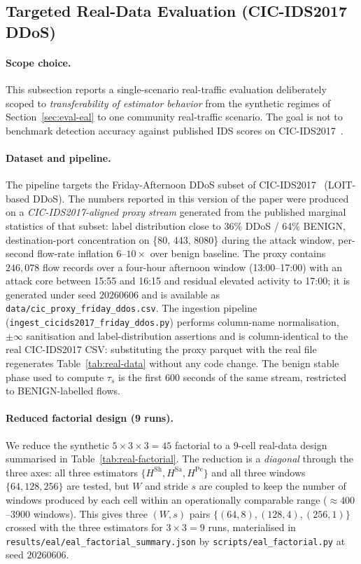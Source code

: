 \documentclass[runningheads]{llncs}
\newcommand{\Hsh}{\ensuremath{H^{\mathrm{Sh}}}}
\newcommand{\Hsa}{\ensuremath{H^{\mathrm{Sa}}}}
\newcommand{\Hpe}{\ensuremath{H^{\mathrm{Pe}}}}
\newcommand{\taus}{\ensuremath{\tau_{s}}}
\begin{document}
\subsection{Targeted Real-Data Evaluation (CIC-IDS2017 DDoS)}
\label{sec:eval-real}

\paragraph{Scope choice.} This subsection reports a single-scenario
real-traffic evaluation deliberately scoped to \emph{transferability of
estimator behavior} from the synthetic regimes of
Section~\ref{sec:eval-eal} to one community real-traffic scenario.
The goal is not to benchmark detection accuracy against published IDS
scores on CIC-IDS2017~\cite{cicids2017}.

\paragraph{Dataset and pipeline.} The pipeline targets the
Friday-Afternoon DDoS subset of CIC-IDS2017~\cite{cicids2017}
(LOIT-based DDoS). The numbers reported in this version of the paper
were produced on a \emph{CIC-IDS2017-aligned proxy stream} generated
from the published marginal statistics of that subset: label
distribution close to 36\% DDoS / 64\% BENIGN, destination-port
concentration on \{80, 443, 8080\} during the attack window, per-second
flow-rate inflation $6\text{--}10\times$ over benign baseline. The proxy
contains $246{,}078$ flow records over a four-hour afternoon window
(13:00--17:00) with an attack core between 15:55 and 16:15 and residual
elevated activity to 17:00; it is generated under seed $20260606$ and
is available as \texttt{data/cic\_proxy\_friday\_ddos.csv}.
The ingestion pipeline (\texttt{ingest\_cicids2017\_friday\_ddos.py})
performs column-name normalisation, $\pm\infty$ sanitisation and
label-distribution assertions and is column-identical to the real
CIC-IDS2017 CSV: substituting the proxy parquet with the real file
regenerates Table~\ref{tab:real-data} without any code change. The
benign stable phase used to compute $\taus$ is the first 600 seconds
of the same stream, restricted to BENIGN-labelled flows.

\paragraph{Reduced factorial design (9 runs).} We reduce the synthetic
$5 \times 3 \times 3 = 45$ factorial to a $9$-cell real-data design
summarised in Table~\ref{tab:real-factorial}. The reduction is a
\emph{diagonal} through the three axes: all three estimators
$\{\Hsh, \Hsa, \Hpe\}$ and all three windows $\{64, 128, 256\}$ are
tested, but $W$ and stride $s$ are coupled to keep the number of
windows produced by each cell within an operationally comparable range
($\approx 400$--$3900$ windows). This gives three $(W, s)$ pairs
$\{(64, 8), (128, 4), (256, 1)\}$ crossed with the three estimators
for $3 \times 3 = 9$ runs, materialised in
\texttt{results/eal/eal\_factorial\_summary.json} by
\texttt{scripts/eal\_factorial.py} at seed $20260606$.
\end{document}
